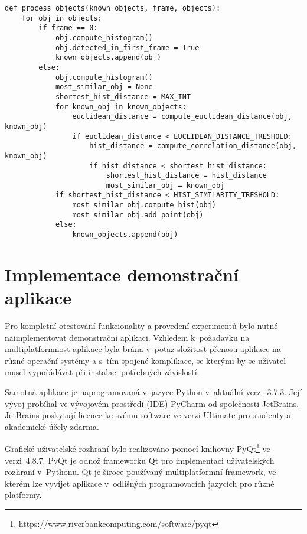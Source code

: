 \begin{minipage}{\linewidth}
    \bigskip
    \begin{lstlisting}
def process_objects(known_objects, frame, objects):
    for obj in objects:
        if frame == 0:
            obj.compute_histogram()
            obj.detected_in_first_frame = True
            known_objects.append(obj)
        else:
            obj.compute_histogram()
            most_similar_obj = None
            shortest_hist_distance = MAX_INT
            for known_obj in known_objects:
                euclidean_distance = compute_euclidean_distance(obj, known_obj)
                if euclidean_distance < EUCLIDEAN_DISTANCE_TRESHOLD:
                    hist_distance = compute_correlation_distance(obj, known_obj)
                    if hist_distance < shortest_hist_distance:
                        shortest_hist_distance = hist_distance
                        most_similar_obj = known_obj
            if shortest_hist_distance < HIST_SIMILARITY_TRESHOLD:
                most_similar_obj.compute_hist(obj)
                most_similar_obj.add_point(obj)
            else:
                known_objects.append(obj)
    \end{lstlisting}
\end{minipage}


\section{Implementace demonstrační aplikace}
\label{sec_implementation}

Pro kompletní otestování funkcionality a provedení experimentů bylo nutné naimplementovat demonstrační aplikaci. Vzhledem k~požadavku na multiplatformnost aplikace byla  brána v~potaz složitost přenosu aplikace na různé operační systémy a s~tím spojené komplikace, se kterými by se uživatel musel vypořádávat při instalaci potřebných závislostí.

Samotná aplikace je naprogramovaná v~jazyce Python v~aktuální verzi~3.7.3. Její vývoj probíhal ve vývojovém prostředí (IDE) PyCharm od společnosti JetBrains. JetBrains poskytují licence ke svému software ve verzi Ultimate pro studenty a akademické účely zdarma.

Grafické uživatelské rozhraní bylo realizováno pomocí knihovny PyQt\footnote{\url{https://www.riverbankcomputing.com/software/pyqt}} ve verzi~4.8.7. PyQt je odnož frameworku Qt pro implementaci uživatelských rozhraní v~Pythonu. Qt je široce používaný multiplatformní framework, ve kterém lze vyvíjet aplikace v~odlišných programovacích jazycích pro různé platformy.

